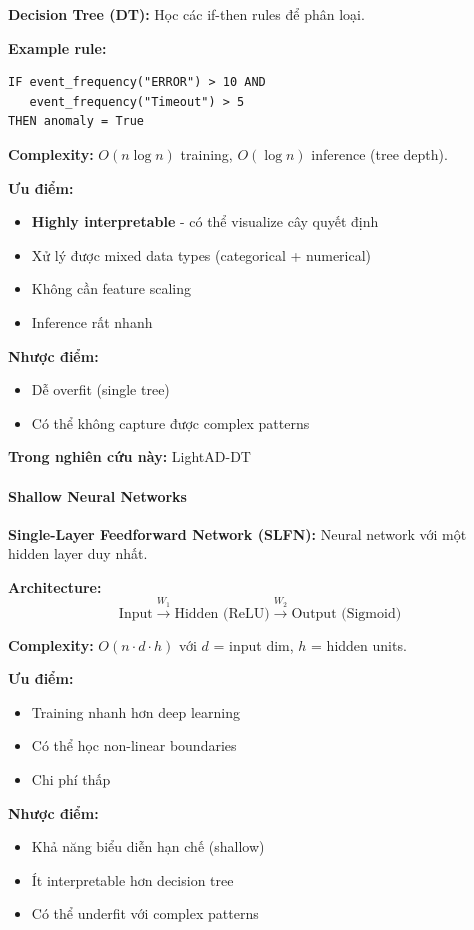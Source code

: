\textbf{Decision Tree (DT):} Học các if-then rules để phân loại.

\textbf{Example rule:}
\begin{verbatim}
IF event_frequency("ERROR") > 10 AND 
   event_frequency("Timeout") > 5 
THEN anomaly = True
\end{verbatim}

\textbf{Complexity:} $O(n \log n)$ training, $O(\log n)$ inference (tree depth).

\textbf{Ưu điểm:}
\begin{itemize}
    \item \textbf{Highly interpretable} - có thể visualize cây quyết định
    \item Xử lý được mixed data types (categorical + numerical)
    \item Không cần feature scaling
    \item Inference rất nhanh
\end{itemize}

\textbf{Nhược điểm:}
\begin{itemize}
    \item Dễ overfit (single tree)
    \item Có thể không capture được complex patterns
\end{itemize}

\textbf{Trong nghiên cứu này:} LightAD-DT

\paragraph{Shallow Neural Networks}

\textbf{Single-Layer Feedforward Network (SLFN):} Neural network với một hidden layer duy nhất.

\textbf{Architecture:}
\[
\text{Input} \xrightarrow{W_1} \text{Hidden (ReLU)} \xrightarrow{W_2} \text{Output (Sigmoid)}
\]

\textbf{Complexity:} $O(n \cdot d \cdot h)$ với $d$ = input dim, $h$ = hidden units.

\textbf{Ưu điểm:}
\begin{itemize}
    \item Training nhanh hơn deep learning
    \item Có thể học non-linear boundaries
    \item Chi phí thấp
\end{itemize}

\textbf{Nhược điểm:}
\begin{itemize}
    \item Khả năng biểu diễn hạn chế (shallow)
    \item Ít interpretable hơn decision tree
    \item Có thể underfit với complex patterns
\end{itemize}

